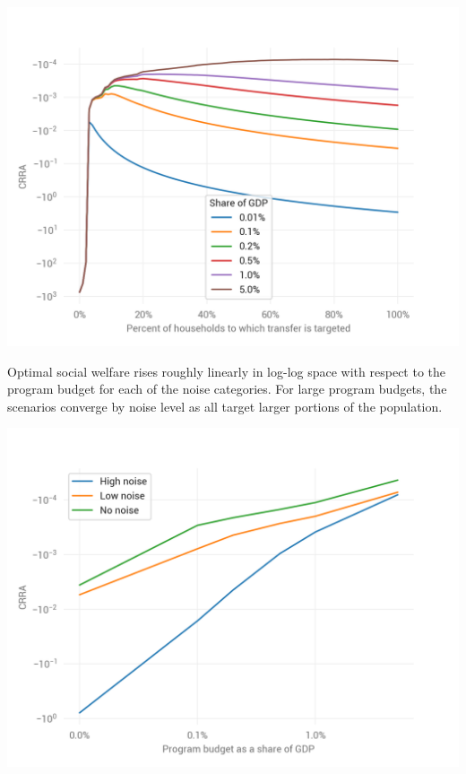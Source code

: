 \documentclass[12pt]{article}
\begin{document}
\begin{center}
	\includegraphics{by_budget_0_Low_noise}  %
	\label{fig:by_budget_0_Low_noise}
\end{center}

Optimal social welfare rises roughly linearly in log-log space with respect to 
the program budget for each of the noise categories. For large program budgets, 
the scenarios converge by noise level as all target larger portions of the 
population.

\begin{center}
	\includegraphics{max_crra_by_size_noise}  %
	\label{fig:max_crra_by_size_noise}
\end{center}
\end{document}
